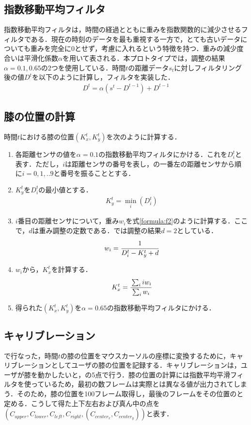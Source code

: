 \subsection{指数移動平均フィルタ}
指数移動平均フィルタは，時間の経過とともに重みを指数関数的に減少させるフィルタである．現在の時刻のデータを最も重視する一方で，とても古いデータについても重みを完全に0とせず，考慮に入れるという特徴を持つ．重みの減少度合いは平滑化係数$\alpha$を用いて表される．本プロトタイプでは，調整の結果$\alpha = 0.1, 0.65$の2つを使用している．時間$t$の距離データ$s_t$に対しフィルタリング後の値$D^t$を以下のように計算し，フィルタを実装した．
\begin{eqnarray}
	D^t = \alpha (s^t - D^{t-1}) + D^{t-1}
\end{eqnarray}
\subsection{膝の位置の計算}
時間$t$における膝の位置$(K^t_x, K^t_y)$を次のように計算する．
\begin{enumerate}
	\item 各距離センサの値を$\alpha=0.1$の指数移動平均フィルタにかける．これを$D^t_i$と表す．ただし，$i$は距離センサの番号を表し，の一番左の距離センサから順に$i=0,1,..9$と番号を振ることとする．
	\item $K^t_y$を$D^t_i $の最小値とする．
		\begin{eqnarray}
		 	K^t_y = \min_i(D^t_i)
		 	\label{formula:f1}
		\end{eqnarray}
	\item $i$番目の距離センサについて，重み$w_i$を式\ref{formula:f2}のように計算する．ここで，$d$は重み調整の定数である．\SysName では調整の結果$d=2$としている．
		\begin{eqnarray}
			w_i = \cfrac{1}{D^t_i - K^t_y + d}
		\label{formula:f2}
	\end{eqnarray}
	\item $w_i$から，$K^t_x$を計算する．
		\begin{eqnarray}
		 	 K^t_x=\cfrac{\sum_i iw_i}{\sum_i w_i}
		 	\label{formula:f3}
		\end{eqnarray} 
	\item 得られた$(K^t_x, K^t_y)$を$\alpha=0.65$の指数移動平均フィルタにかける．
\end{enumerate}
\subsection{キャリブレーション}
で行なった，時間$t$の膝の位置をマウスカーソルの座標に変換するために，キャリブレーションとしてユーザの膝の位置を記録する．キャリブレーションは，ユーザが膝を動かしたいと，の5点で行う．膝の位置の計算には指数平均平滑フィルタを使っているため，最初の数フレームは実際とは異なる値が出力されてしまう．そのため，膝の位置を100フレーム取得し，最後のフレームをその位置のと定める．こうして得た上下左右および真ん中の点を$(C_{upper}, C_{lower}, C_{left}, C_{right}, (C_{center_x}, C_{center_y}))$と表す．
